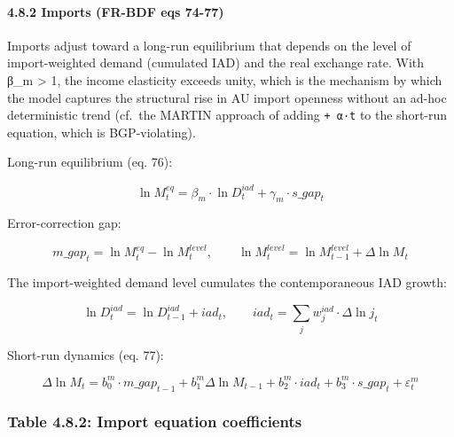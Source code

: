 \documentclass[
]{article}
\begin{document}
\paragraph{4.8.2 Imports (FR-BDF eqs
74-77)}\label{imports-fr-bdf-eqs-74-77}

Imports adjust toward a long-run equilibrium that depends on the level
of import-weighted demand (cumulated IAD) and the real exchange rate.
With β\_m \textgreater{} 1, the income elasticity exceeds unity, which
is the mechanism by which the model captures the structural rise in AU
import openness without an ad-hoc deterministic trend (cf.~the MARTIN
approach of adding \texttt{+\ α·t} to the short-run equation, which is
BGP-violating).

Long-run equilibrium (eq. 76):

\[\ln M^{eq}_t = \beta_m \cdot \ln D^{iad}_t + \gamma_m \cdot s\_gap_t\]

Error-correction gap:

\[m\_gap_t = \ln M^{eq}_t - \ln M^{level}_t, \qquad \ln M^{level}_t = \ln M^{level}_{t-1} + \Delta \ln M_t\]

The import-weighted demand level cumulates the contemporaneous IAD
growth:

\[\ln D^{iad}_t = \ln D^{iad}_{t-1} + iad_t, \qquad iad_t = \sum_j w^{iad}_j \cdot \Delta \ln j_t\]

Short-run dynamics (eq. 77):

\[\Delta \ln M_t = b^m_0 \cdot m\_gap_{t-1} + b^m_1 \Delta \ln M_{t-1} + b^m_2 \cdot iad_t + b^m_3 \cdot s\_gap_t + \varepsilon^m_t\]

\subsubsection{Table 4.8.2: Import equation
coefficients}\label{table-4.8.2-import-equation-coefficients}
\end{document}
